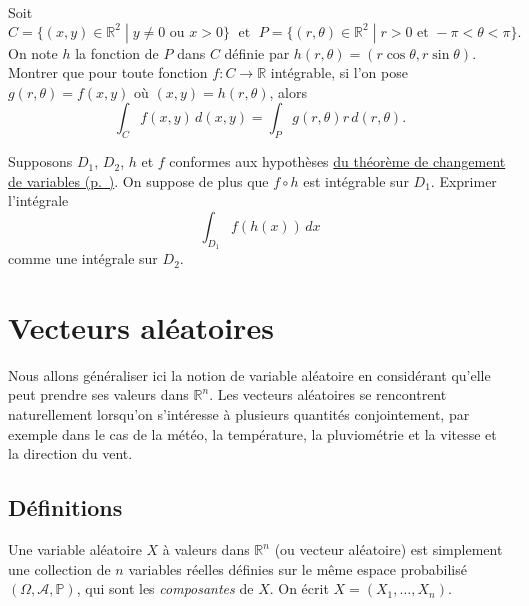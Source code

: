 \label{II-cp}
Soit \[
C = \{(x, y) \in \mathbb{R}^2 \; | \; y \neq 0 \mbox{ ou } x > 0\}
\; \mbox{ et } \;
P = \{(r,\theta) \in \mathbb{R}^2 \; | \; r>0 \mbox{ et } -\pi < \theta < \pi\}.\]
On note \(h\) la fonction de \(P\) dans \(C\) définie par
\(h(r, \theta) = (r \cos \theta, r \sin \theta)\). Montrer que pour
toute fonction \(f: C \to \mathbb{R}\) intégrable, si l'on pose
\(g(r,\theta) = f(x, y)\) où \((x, y) = h(r,\theta)\), alors \[
\int_{C} f(x, y) \, d(x,y) = \int_{P} g(r,\theta)  r \, d(r, \theta).
\]


\label{II-adj}
Supposons \(D_1\), \(D_2\), \(h\) et \(f\) conformes aux hypothèses
\protect\hyperref[II-theorem-changement-de-variables]{du théorème de
changement de
variables (p.~\pageref*{II-theorem-changement-de-variables})}. On
suppose de plus que \(f \circ h\) est intégrable sur \(D_1\). Exprimer
l'intégrale \[
\int_{D_1} f (h(x)) \, dx
\] comme une intégrale sur \(D_2\).

\chapter{Vecteurs aléatoires}\label{II-vecteurs-aluxe9atoires-1}

Nous allons généraliser ici la notion de variable aléatoire en
considérant qu'elle peut prendre ses valeurs dans \(\mathbb{R}^n\). Les
vecteurs aléatoires se rencontrent naturellement lorsqu'on s'intéresse à
plusieurs quantités conjointement, par exemple dans le cas de la météo,
la température, la pluviométrie et la vitesse et la direction du vent.

\section{Définitions}\label{II-duxe9finitions}

Une variable aléatoire \(X\) à valeurs dans \(\mathbb{R}^n\) (ou vecteur
aléatoire) est simplement une collection de \(n\) variables réelles
définies sur le même espace probabilisé
\((\Omega, \mathcal{A}, \mathbb{P})\), qui sont les \emph{composantes}
de \(X\). On écrit \(X = (X_1,\ldots,X_n)\).

